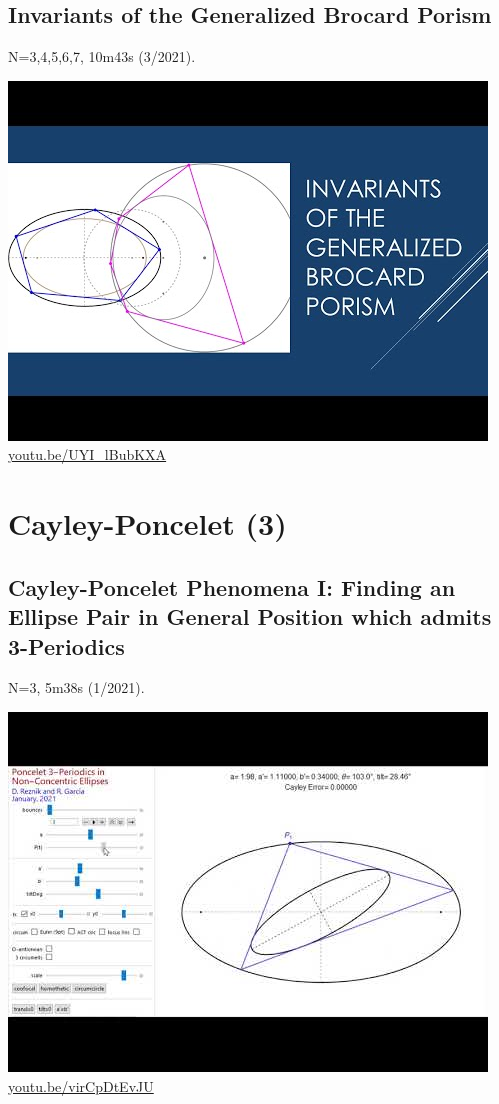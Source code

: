 \documentclass[12pt]{amsart}
\begin{document}
\subsection{Invariants of the Generalized Brocard Porism}
\label{vid:UYI_lBubKXA}
\noindent N=3,4,5,6,7, 10m43s (3/2021). 
\begin{center}\includegraphics[width=.5\textwidth]{pics/UYI_lBubKXA.jpg} \\ 
\href{https://youtu.be/UYI_lBubKXA}{\url{youtu.be/UYI\_lBubKXA}}\end{center}
% 


\section{Cayley-Poncelet (3)}

\subsection{Cayley-Poncelet Phenomena I: Finding an Ellipse Pair in General Position which admits 3-Periodics}
\label{vid:virCpDtEvJU}
\noindent N=3, 5m38s (1/2021). 
\begin{center}\includegraphics[width=.5\textwidth]{pics/virCpDtEvJU.jpg} \\ 
\href{https://youtu.be/virCpDtEvJU}{\url{youtu.be/virCpDtEvJU}}\end{center}
% 
\end{document}
